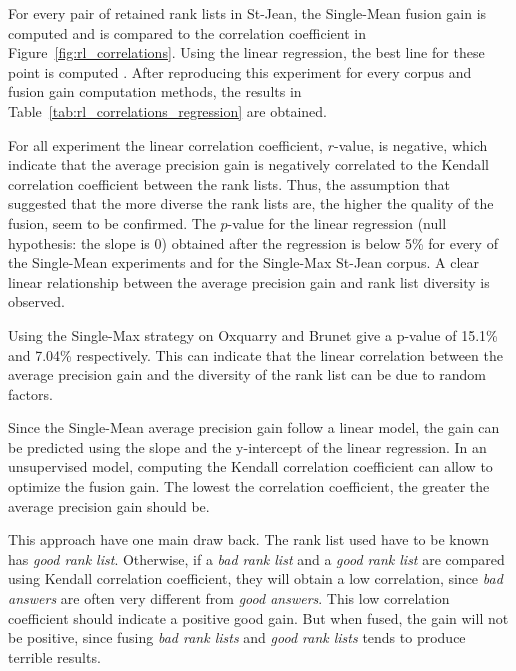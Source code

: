 For every pair of retained rank lists in St-Jean, the Single-Mean fusion gain is computed and is compared to the correlation coefficient in Figure~\ref{fig:rl_correlations}.
Using the linear regression, the best line for these point is computed \cite{scipy}.
After reproducing this experiment for every corpus and fusion gain computation methods, the results in Table~\ref{tab:rl_correlations_regression} are obtained.

For all experiment the linear correlation coefficient, $r$-value, is negative, which indicate that the average precision gain is negatively correlated to the Kendall correlation coefficient between the rank lists.
Thus, the assumption that suggested that the more diverse the rank lists are, the higher the quality of the fusion, seem to be confirmed.
The $p$-value for the linear regression (null hypothesis: the slope is 0) obtained after the regression is below 5\% for every of the Single-Mean experiments and for the Single-Max St-Jean corpus.
A clear linear relationship between the average precision gain and rank list diversity is observed.

Using the Single-Max strategy on Oxquarry and Brunet give a p-value of 15.1\% and 7.04\% respectively.
This can indicate that the linear correlation between the average precision gain and the diversity of the rank list can be due to random factors.

Since the Single-Mean average precision gain follow a linear model, the gain can be predicted using the slope and the y-intercept of the linear regression.
In an unsupervised model, computing the Kendall correlation coefficient can allow to optimize the fusion gain.
The lowest the correlation coefficient, the greater the average precision gain should be.

This approach have one main draw back.
The rank list used have to be known has \textit{good rank list}.
Otherwise, if a \textit{bad rank list} and a \textit{good rank list} are compared using Kendall correlation coefficient, they will obtain a low correlation, since \textit{bad answers} are often very different from \textit{good answers}.
This low correlation coefficient should indicate a positive good gain.
But when fused, the gain will not be positive, since fusing \textit{bad rank lists} and \textit{good rank lists} tends to produce terrible results.

